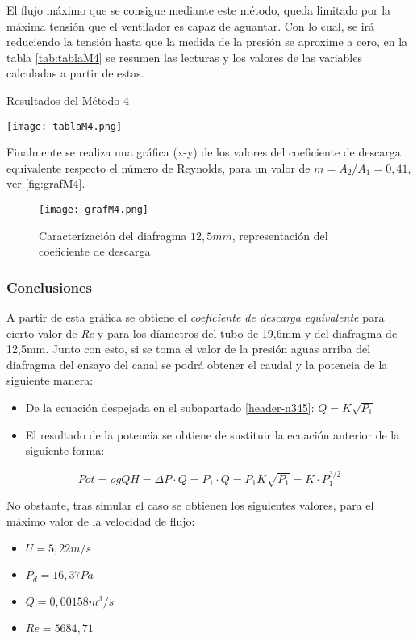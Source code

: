 El flujo máximo que se consigue mediante este método, queda limitado por
la máxima tensión que el ventilador es capaz de aguantar. Con lo cual,
se irá reduciendo la tensión hasta que la medida de la presión se
aproxime a cero, en la tabla \autoref{tab:tablaM4} se resumen las lecturas y los valores de las variables calculadas a partir de estas.

\begin{table}[hb]
\centering
\caption{Resultados del Método 4}
\texttt{[image: tablaM4.png]}
\label{tab:tablaM4}
\end{table}

Finalmente se realiza una gráfica (x-y) de los valores del coeficiente
de descarga equivalente respecto el número de Reynolds, para un valor de
\(m=A_2/A_1=0,41\), ver \autoref{fig:grafM4}.

\begin{figure}[ht]
\centering
\texttt{[image: grafM4.png]}
\caption[Caracterización del diafragma $12,5mm$]{Caracterización del diafragma $12,5mm$, representación del coeficiente de descarga}
\label{fig:grafM4}
\end{figure}

\subsubsection{Conclusiones}\label{header-n423}

A partir de esta gráfica se obtiene el \emph{coeficiente de descarga
equivalente} para cierto valor de \emph{Re} y para los díametros del
tubo de 19,6mm y del diafragma de 12,5mm. Junto con esto, si se toma el
valor de la presión aguas arriba del diafragma del ensayo del canal se
podrá obtener el caudal y la potencia de la siguiente manera:

\begin{itemize}
\item
  De la ecuación despejada en el subapartado \ref{header-n345}: \(Q=K\sqrt{P_1}\)
\item
  El resultado de la potencia se obtiene de sustituir la ecuación
  anterior de la siguiente forma:
\end{itemize}

\[Pot= \rho g Q H = \Delta P \cdot Q=P_1\cdot Q=P_1K\sqrt{P_1}=K\cdot P_1^{3/2}\]

No obstante, tras simular el caso se obtienen los siguientes valores,
para el máximo valor de la velocidad de flujo:

\begin{itemize}
\item
  \(U=5,22 m/s\)
\item
  \(P_d=16,37Pa\)
\item
  \(Q=0,00158m^3/s\)
\item
  \(Re=5684,71\)
\end{itemize}

